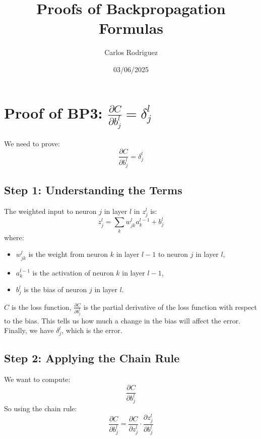 \documentclass{article}
\begin{document}
\title{Proofs of Backpropagation Formulas}
\author{Carlos Rodriguez}
\date{03/06/2025}
\maketitle

\section{Proof of BP3: $\frac{\partial C}{\partial b_j^l} = \delta_j^l$}
We need to prove:
\begin{equation}
    \frac{\partial C}{\partial b_j^l} = \delta_j^l
\end{equation}

\subsection{Step 1: Understanding the Terms}
The weighted input to neuron $j$ in layer $l$ in $z_j^l$ is:
\begin{equation}
    z_j^l = \sum_k w_{jk}^{l} a_k^{l-1} + b_j^l
\end{equation}
where:
\begin{itemize}
    \item $w_{jk}^{l}$ is the weight from neuron $k$ in layer $l-1$ to neuron $j$ in layer $l$,
    \item $a_k^{l-1}$ is the activation of neuron $k$ in layer $l-1$,
    \item $b_j^l$ is the bias of neuron $j$ in layer $l$.
\end{itemize}
$C$ is the loss function, $\frac{\partial C}{\partial b_j^l}$ is the partial derivative of the loss function with respect to the bias. This tells us how much a change in the bias will affect the error. Finally, we have $\delta_j^l$, which is the error.

\subsection{Step 2: Applying the Chain Rule}
We want to compute:
\begin{equation}
    \frac{\partial C}{\partial b_j^l}
\end{equation}
So using the chain rule:
\begin{equation}
    \frac{\partial C}{\partial b_j^l} = \frac{\partial C}{\partial z_j^l} \cdot \frac{\partial z_j^l}{\partial b_j^l}
\end{equation}
\end{document}
